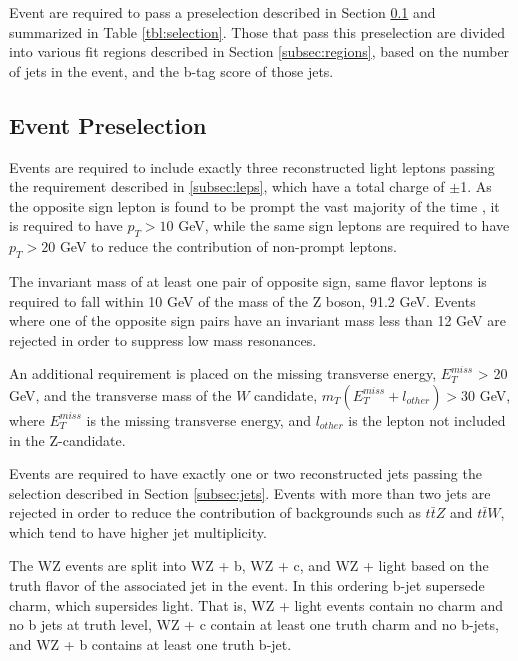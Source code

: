 
Event are required to pass a preselection described in Section \ref{subsec:presel} and summarized in Table \ref{tbl:selection}. Those that pass this preselection are divided into various fit regions described in Section \ref{subsec:regions}, based on the number of jets in the event, and the b-tag score of those jets.

\subsection{Event Preselection}
\label{subsec:presel}

Events are required to include exactly three reconstructed light leptons passing the requirement described in \ref{subsec:leps}, which have a total charge of $\pm$1. As the opposite sign lepton is found to be prompt the vast majority of the time \cite{ttH_paper}, it is required to have $p_T > 10$ GeV, while the same sign leptons are required to have $p_T > 20$ GeV to reduce the contribution of non-prompt leptons.

The invariant mass of at least one pair of opposite sign, same flavor leptons is required to fall within 10 GeV of the mass of the Z boson, 91.2 GeV. Events where one of the opposite sign pairs have an invariant mass less than 12 GeV are rejected in order to suppress low mass resonances. %

An additional requirement is placed on the missing transverse energy, $E^{miss}_T$ > 20 GeV, and the transverse mass of the $W$ candidate, $m_T(E^{miss}_T + l_{other}) > 30$ GeV, where $E^{miss}_T$ is the missing transverse energy, and $l_{other}$ is the lepton not included in the Z-candidate. 

Events are required to have exactly one or two reconstructed jets passing the selection described in Section \ref{subsec:jets}. Events with more than two jets are rejected in order to reduce the contribution of backgrounds such as $t\bar{t}Z$ and $t\bar{t}W$, which tend to have higher jet multiplicity. 

The WZ events are split into WZ + b, WZ + c, and WZ + light based on the truth flavor of the associated jet in the event. In this ordering b-jet supersede charm, which supersides light. That is, WZ + light events contain no charm and no b jets at truth level, WZ + c contain at least one truth charm and no b-jets, and WZ + b contains at least one truth b-jet. 

